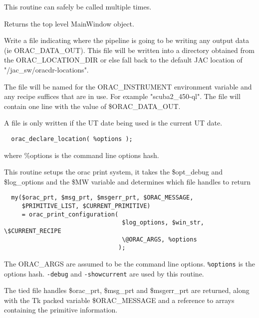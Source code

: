 \begin{description}
This routine can safely be called multiple times.



Returns the top level MainWindow object.


\item[{\textbf{orac\_declare\_location}}] \mbox{}

Write a file indicating where the pipeline is going to be writing
any output data (ie ORAC\_DATA\_OUT). This file will be written into
a directory obtained from the ORAC\_LOCATION\_DIR or else fall back
to the default JAC location of "/jac\_sw/oracdr-locations".



The file will be named for the ORAC\_INSTRUMENT environment variable
and any recipe suffices that are in use. For example "scuba2\_450-ql".
The file will contain one line with the value of \$ORAC\_DATA\_OUT.



A file is only written if the UT date being used is the current
UT date.

\begin{verbatim}
  orac_declare_location( %options );
\end{verbatim}


where \%options is the command line options hash.


\item[{\textbf{orac\_print\_configuration}}] \mbox{}

This routine setups the orac print system, it takes the \$opt\_debug and
\$log\_options and the \$MW variable and determines which file handles to return

\begin{verbatim}
  my($orac_prt, $msg_prt, $msgerr_prt, $ORAC_MESSAGE,
     $PRIMITIVE_LIST, $CURRENT_PRIMITIVE)
     = orac_print_configuration(
                                 $log_options, $win_str, \$CURRENT_RECIPE
                                 \@ORAC_ARGS, %options
                                );
\end{verbatim}


The ORAC\_ARGS are assumed to be the command line options. \texttt{\%options}
is the options hash. \texttt{-debug} and \texttt{-showcurrent} are used by this
routine.



The tied file handles \$orac\_prt, \$msg\_prt and \$msgerr\_prt are
returned, along with the Tk packed variable \$ORAC\_MESSAGE and
a reference to arrays containing the primitive information.



\end{description}
